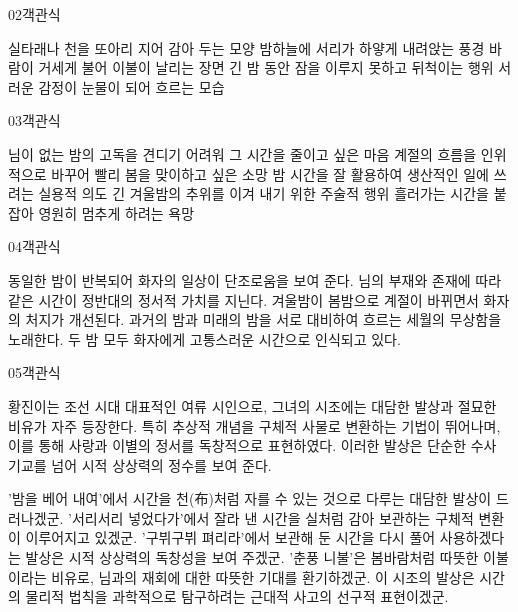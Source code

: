 \documentclass[fs85,seriesWit]{korfarm-base}
\begin{document}
\begin{kfQBlock}{02}{객관식}
\begin{kfChoices}
\kfChoice 실타래나 천을 또아리 지어 감아 두는 모양
\kfChoice 밤하늘에 서리가 하얗게 내려앉는 풍경
\kfChoice 바람이 거세게 불어 이불이 날리는 장면
\kfChoice 긴 밤 동안 잠을 이루지 못하고 뒤척이는 행위
\kfChoice 서러운 감정이 눈물이 되어 흐르는 모습
\end{kfChoices}
\end{kfQBlock}

\begin{kfQBlock}{03}{객관식}
\begin{kfChoices}
\kfChoice 님이 없는 밤의 고독을 견디기 어려워 그 시간을 줄이고 싶은 마음
\kfChoice 계절의 흐름을 인위적으로 바꾸어 빨리 봄을 맞이하고 싶은 소망
\kfChoice 밤 시간을 잘 활용하여 생산적인 일에 쓰려는 실용적 의도
\kfChoice 긴 겨울밤의 추위를 이겨 내기 위한 주술적 행위
\kfChoice 흘러가는 시간을 붙잡아 영원히 멈추게 하려는 욕망
\end{kfChoices}
\end{kfQBlock}

\begin{kfQBlock}{04}{객관식}
\begin{kfChoices}
\kfChoice 동일한 밤이 반복되어 화자의 일상이 단조로움을 보여 준다.
\kfChoice 님의 부재와 존재에 따라 같은 시간이 정반대의 정서적 가치를 지닌다.
\kfChoice 겨울밤이 봄밤으로 계절이 바뀌면서 화자의 처지가 개선된다.
\kfChoice 과거의 밤과 미래의 밤을 서로 대비하여 흐르는 세월의 무상함을 노래한다.
\kfChoice 두 밤 모두 화자에게 고통스러운 시간으로 인식되고 있다.
\end{kfChoices}
\end{kfQBlock}

\begin{kfQBlock}{05}{객관식}
\begin{kfEvidence}황진이는 조선 시대 대표적인 여류 시인으로, 그녀의 시조에는 대담한 발상과 절묘한 비유가 자주 등장한다. 특히 추상적 개념을 구체적 사물로 변환하는 기법이 뛰어나며, 이를 통해 사랑과 이별의 정서를 독창적으로 표현하였다. 이러한 발상은 단순한 수사 기교를 넘어 시적 상상력의 정수를 보여 준다.\end{kfEvidence}
\begin{kfChoices}
\kfChoice '밤을 베어 내여'에서 시간을 천(布)처럼 자를 수 있는 것으로 다루는 대담한 발상이 드러나겠군.
\kfChoice '서리서리 넣었다가'에서 잘라 낸 시간을 실처럼 감아 보관하는 구체적 변환이 이루어지고 있겠군.
\kfChoice '구뷔구뷔 펴리라'에서 보관해 둔 시간을 다시 풀어 사용하겠다는 발상은 시적 상상력의 독창성을 보여 주겠군.
\kfChoice '춘풍 니불'은 봄바람처럼 따뜻한 이불이라는 비유로, 님과의 재회에 대한 따뜻한 기대를 환기하겠군.
\kfChoice 이 시조의 발상은 시간의 물리적 법칙을 과학적으로 탐구하려는 근대적 사고의 선구적 표현이겠군.
\end{kfChoices}
\end{kfQBlock}
\end{document}
